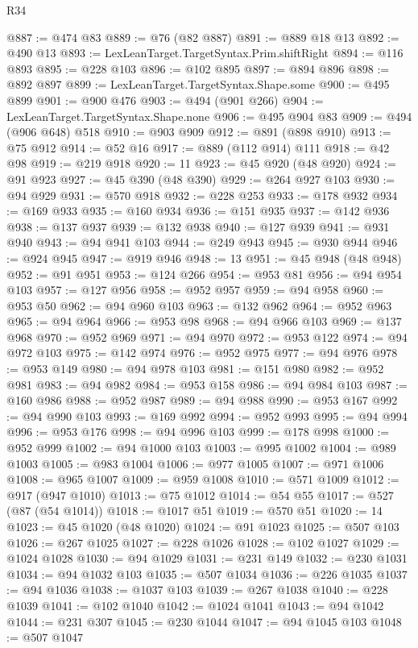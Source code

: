 \begin{lexlean}{R34}
\begin{coremodule}
@887 := @474 @83
@889 := @76 (@82 @887)
@891 := @889 @18 @13
@892 := @490 @13
@893 := LexLeanTarget.TargetSyntax.Prim.shiftRight
@894 := @116 @893
@895 := @228 @103
@896 := @102 @895
@897 := @894 @896
@898 := @892 @897
@899 := LexLeanTarget.TargetSyntax.Shape.some
@900 := @495 @899
@901 := @900 @476
@903 := @494 (@901 @266)
@904 := LexLeanTarget.TargetSyntax.Shape.none
@906 := @495 @904 @83
@909 := @494 (@906 @648) @518
@910 := @903 @909
@912 := @891 (@898 @910)
@913 := @75 @912
@914 := @52 @16
@917 := @889 (@112 @914) @111
@918 := @42 @98
@919 := @219 @918
@920 := 11
@923 := @45 @920 (@48 @920)
@924 := @91 @923
@927 := @45 @390 (@48 @390)
@929 := @264 @927 @103
@930 := @94 @929
@931 := @570 @918
@932 := @228 @253
@933 := @178 @932
@934 := @169 @933
@935 := @160 @934
@936 := @151 @935
@937 := @142 @936
@938 := @137 @937
@939 := @132 @938
@940 := @127 @939
@941 := @931 @940
@943 := @94 @941 @103
@944 := @249 @943
@945 := @930 @944
@946 := @924 @945
@947 := @919 @946
@948 := 13
@951 := @45 @948 (@48 @948)
@952 := @91 @951
@953 := @124 @266
@954 := @953 @81
@956 := @94 @954 @103
@957 := @127 @956
@958 := @952 @957
@959 := @94 @958
@960 := @953 @50
@962 := @94 @960 @103
@963 := @132 @962
@964 := @952 @963
@965 := @94 @964
@966 := @953 @98
@968 := @94 @966 @103
@969 := @137 @968
@970 := @952 @969
@971 := @94 @970
@972 := @953 @122
@974 := @94 @972 @103
@975 := @142 @974
@976 := @952 @975
@977 := @94 @976
@978 := @953 @149
@980 := @94 @978 @103
@981 := @151 @980
@982 := @952 @981
@983 := @94 @982
@984 := @953 @158
@986 := @94 @984 @103
@987 := @160 @986
@988 := @952 @987
@989 := @94 @988
@990 := @953 @167
@992 := @94 @990 @103
@993 := @169 @992
@994 := @952 @993
@995 := @94 @994
@996 := @953 @176
@998 := @94 @996 @103
@999 := @178 @998
@1000 := @952 @999
@1002 := @94 @1000 @103
@1003 := @995 @1002
@1004 := @989 @1003
@1005 := @983 @1004
@1006 := @977 @1005
@1007 := @971 @1006
@1008 := @965 @1007
@1009 := @959 @1008
@1010 := @571 @1009
@1012 := @917 (@947 @1010)
@1013 := @75 @1012
@1014 := @54 @55
@1017 := @527 (@87 (@54 @1014))
@1018 := @1017 @51
@1019 := @570 @51
@1020 := 14
@1023 := @45 @1020 (@48 @1020)
@1024 := @91 @1023
@1025 := @507 @103
@1026 := @267 @1025
@1027 := @228 @1026
@1028 := @102 @1027
@1029 := @1024 @1028
@1030 := @94 @1029
@1031 := @231 @149
@1032 := @230 @1031
@1034 := @94 @1032 @103
@1035 := @507 @1034
@1036 := @226 @1035
@1037 := @94 @1036
@1038 := @1037 @103
@1039 := @267 @1038
@1040 := @228 @1039
@1041 := @102 @1040
@1042 := @1024 @1041
@1043 := @94 @1042
@1044 := @231 @307
@1045 := @230 @1044
@1047 := @94 @1045 @103
@1048 := @507 @1047

\end{coremodule}
\end{lexlean}
